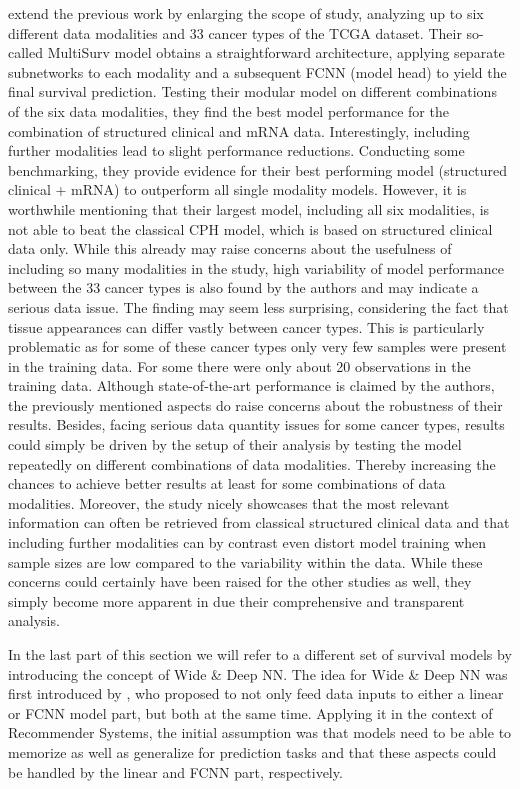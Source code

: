 \documentclass[
]{krantz}
\begin{document}
\citet{MultiSurv2021} extend the previous work by enlarging the scope of study, analyzing up to six different data modalities and 33 cancer types of the TCGA dataset. Their so-called MultiSurv model obtains a straightforward architecture, applying separate subnetworks to each modality and a subsequent FCNN (model head) to yield the final survival prediction. Testing their modular model on different combinations of the six data modalities, they find the best model performance for the combination of structured clinical and mRNA data. Interestingly, including further modalities lead to slight performance reductions. Conducting some benchmarking, they provide evidence for their best performing model (structured clinical + mRNA) to outperform all single modality models. However, it is worthwhile mentioning that their largest model, including all six modalities, is not able to beat the classical CPH model, which is based on structured clinical data only. While this already may raise concerns about the usefulness of including so many modalities in the study, high variability of model performance between the 33 cancer types is also found by the authors and may indicate a serious data issue. The finding may seem less surprising, considering the fact that tissue appearances can differ vastly between cancer types. This is particularly problematic as for some of these cancer types only very few samples were present in the training data. For some there were only about 20 observations in the training data. Although state-of-the-art performance is claimed by the authors, the previously mentioned aspects do raise concerns about the robustness of their results. Besides, facing serious data quantity issues for some cancer types, results could simply be driven by the setup of their analysis by testing the model repeatedly on different combinations of data modalities. Thereby increasing the chances to achieve better results at least for some combinations of data modalities. Moreover, the study nicely showcases that the most relevant information can often be retrieved from classical structured clinical data and that including further modalities can by contrast even distort model training when sample sizes are low compared to the variability within the data. While these concerns could certainly have been raised for the other studies as well, they simply become more apparent in \citet{MultiSurv2021} due their comprehensive and transparent analysis.

In the last part of this section we will refer to a different set of survival models by introducing the concept of Wide \& Deep NN. The idea for Wide \& Deep NN was first introduced by \citet{WideDeepNN2016}, who proposed to not only feed data inputs to either a linear or FCNN model part, but both at the same time. Applying it in the context of Recommender Systems, the initial assumption was that models need to be able to memorize as well as generalize for prediction tasks and that these aspects could be handled by the linear and FCNN part, respectively.
\end{document}
